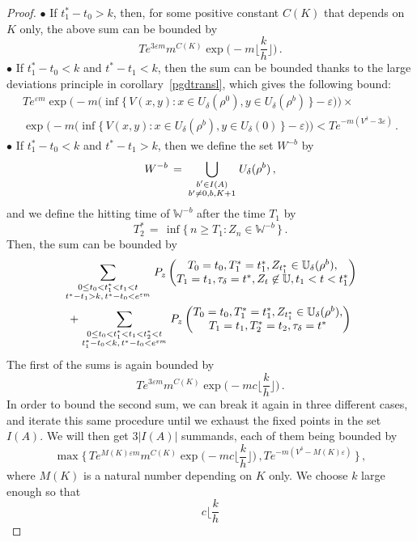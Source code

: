 \documentclass[a4paper,12pt]{article}
\theoremstyle{definition}
\theoremstyle{remark}
\def \d {\delta}
\def \e {\varepsilon}
\def \dU {\mathbb{U}}
\def \W {\mathbb{W}}
\begin{document}
\begin{proof}
$\bullet$ If $t_1^*-t_0>k$, then, 
for some positive constant $C(K)$
that depends on $K$ only, the above sum can be bounded by
$$Te^{3\e m}m^{C(K)}\exp\Bigg(
-m \bigg\lfloor
\frac{k}{h}
\bigg\rfloor
\Bigg)\,.$$
$\bullet$ If $t_1^*-t_0<k$ and $t^*-t_1<k$, then
the sum can be bounded thanks to the large deviations principle in corollary~\ref{pgdtransl},
which gives the following bound:
\begin{multline*}
Te^{\e m}\exp\bigg(
-m\Big(
\inf\big\lbrace\,
V(x,y):x\in U_\d(\rho^0),y\in U_\d(\rho^b)
\,\big\rbrace-\e
\Big)
\bigg)\times\\
\exp\bigg(
-m\Big(
\inf\big\lbrace\,
V(x,y):x\in U_\d(\rho^b),y\in U_\d(0)
\,\big\rbrace-\e
\Big)
\bigg)
<Te^{-m(V^\d-3\e)}\,.
\end{multline*}
$\bullet$ If $t_1^*-t_0<k$ and $t^*-t_1>k$,
then we define the set $W^{-b}$ by
$$W^{-b}\,=\,\bigcup_{\genfrac{}{}{0pt}{1}{b'\in I(A)}{b'\neq 0, b, K+1}}
U_\d(\rho^b)\,,$$
and we define the hitting time of $\W^{-b}$ after the time $T_1$ by
$$T_2^*\,=\,\inf\big\lbrace\,
n\geq T_1:Z_n\in\W^{-b}
\,\big\rbrace\,.$$
Then, the sum can be bounded by
\begin{multline*}
\sum_{\genfrac{}{}{0pt}{1}{0\leq t_0<t_1^*<t_1<t}{t^*-t_1>k,\, t^*-t_0<e^{\e m}}}
P_z\left(
\begin{matrix}
T_0=t_0,T_1^*=t_1^*,Z_{t_1^*}\in\dU_\d(\rho^b),\\
T_1=t_1,\tau_\d=t^*,Z_t\not\in\dU,t_1<t<t_1^*
\end{matrix}
\right)
\\+
\sum_{\genfrac{}{}{0pt}{1}{0\leq t_0<t_1^*<t_1<t_2^*<t}{t_1^*-t_0<k,\, t^*-t_0<e^{\e m}}}
P_z\left(
\begin{matrix}
T_0=t_0,T_1^*=t_1^*,Z_{t_1^*}\in\dU_\d(\rho^b),\\
T_1=t_1,T_2^*=t_2,\tau_\d=t^*
\end{matrix}
\right)
\end{multline*}
The first of the sums is again bounded by
$$Te^{3\e m}m^{C(K)}\exp\Bigg(
-m c\bigg\lfloor
\frac{k}{h}
\bigg\rfloor
\Bigg)\,.$$
In order to bound the second sum, we can break it again in three different cases,
and iterate this same procedure until we exhaust the fixed points in the set $I(A)$.
We will then get $3|I(A)|$ summands,
each of them being bounded by 
$$
\max\Bigg\lbrace\,
Te^{M(K)\e m}m^{C(K)}\exp\Bigg(
-m c\bigg\lfloor
\frac{k}{h}
\bigg\rfloor
\Bigg)\,,
Te^{-m(V^\d-M(K)\e)}
\,\Bigg\rbrace\,,
$$
where $M(K)$ is a natural number depending on $K$ only.
We choose $k$ large enough so that
$$c\Big\lfloor
\frac{k}{h}
$$
\end{proof}
\end{document}
